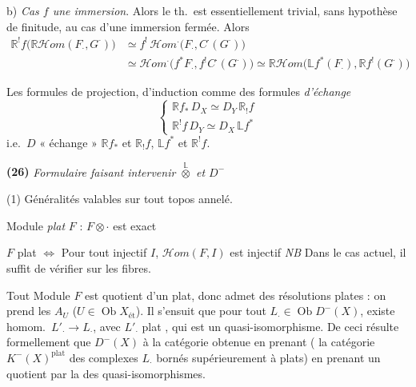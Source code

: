 \documentclass[11pt,a4paper]{article}
\begin{document}
b) \emph{Cas $f$ une immersion}. Alors le th.\ est essentiellement trivial, sans hypothèse de finitude, \ill{}  au cas d'une immersion fermée. Alors
\begin{align*}
\mathbb{R}^!f\bigl(\mathbb{R}\mathcal{H}om(F_{\cdot},G^{\cdot})\bigr)&\simeq f^!\,\mathcal{H}om^{\cdot}\bigl(F_{\cdot},C^{\cdot}(G^{\cdot})\bigr)\\
&\simeq\mathcal{H}om^{\cdot}\bigl(f^{*}F_{\cdot},f^!C^{\cdot}(G^{\cdot})\bigr)\simeq\mathbb{R}\mathcal{H}om\bigl(\mathbb{L}f^{*}(F_{\cdot}),\mathbb{R}f^!(G^{\cdot})\bigr)
\end{align*}

Les formules de projection, d'induction  comme des formules  \emph{d'échange}
\[
\begin{cases}
\mathbb{R}f_{*}\,D_{X}\simeq D_{Y}\,\mathbb{R}_!f\\
\mathbb{R}^!f\,D_{Y}\simeq D_{X}\,\mathbb{L}f^{*}
\end{cases}
\]
i.e.\ $D$ « échange » $\mathbb{R}f_{*}$ et $\mathbb{R}_!f$, $\mathbb{L}f^{*}$ et $\mathbb{R}^!f$.

\textbf{(26)} \emph{Formulaire faisant intervenir $\overset{\mathbb{L}}{\otimes}$ et $D^{-}$}

(1) Généralités valables sur tout topos annelé.

Module \emph{plat} $F$ : $F\otimes\cdot$ est exact

$F$ plat $\Longleftrightarrow$ Pour tout injectif $I$, $\mathcal{H}om(F,I)$ est injectif
\quad \emph{NB} Dans le cas actuel, il suffit de vérifier sur les fibres.

Tout Module $F$  est quotient d'un plat, donc admet des résolutions plates : on prend les $A_{U}$ ($U\in\operatorname{Ob}X_{\text{ét}}$). Il s'ensuit  que pour tout $L_{\cdot}\in\operatorname{Ob}D^{-}(X)$, existe homom.\ $L'_{\cdot}\to L_{\cdot}$, avec $L'_{\cdot}$ plat , qui est un quasi-isomorphisme. De ceci résulte formellement que $D^{-}(X)$  à la catégorie obtenue en prenant ( la catégorie $K^{-}(X)^{\text{plat}}$ des complexes $L_{\cdot}$ bornés supérieurement à  plats) \struck{\ill{}} en prenant un quotient par la   des quasi-isomorphismes.
\end{document}
